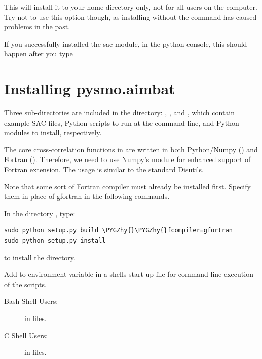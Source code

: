 \documentclass[letterpaper,10pt,english]{sphinxmanual}
\def\PYGZhy{\char`\-}
\begin{document}
This will install it to your home directory only, not for all users on the computer. Try not to use this option though, as installing without the  command has caused problems in the past.

If you successfully installed the sac module, in the python console, this should happen after you type 


\section{Installing pysmo.aimbat}
\label{docfiles/install_aimbat:installing-pysmo-aimbat}
Three sub-directories are included in the  directory: , , and , which contain example SAC files, Python scripts to run at the command line, and Python modules to install, respectively.

The core cross-correlation functions in  are written in both Python/Numpy () and Fortran (). Therefore, we need to use Numpy’s  module for enhanced support of Fortran extension. The usage is similar to the standard Disutils.

Note that some sort of Fortran compiler must already be installed first. Specify them in place of gfortran in the following commands.

In the directory , type:

\begin{Verbatim}[commandchars=\\\{\}]
sudo python setup.py build \PYGZhy{}\PYGZhy{}fcompiler=gfortran
sudo python setup.py install
\end{Verbatim}

to install the  directory.

Add  to environment variable  in a shells start-up file for command line execution of the scripts.
\begin{description}
\item[{Bash Shell Users:}] \leavevmode
{} in  files.

\item[{C Shell Users:}] \leavevmode
{} in  files.

\end{description}
\end{document}
